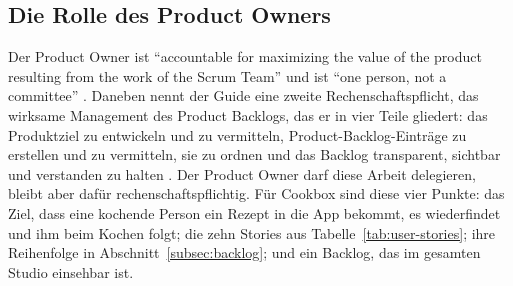 \subsection{Die Rolle des Product Owners}

%
%
%
Der Product Owner ist \enquote{accountable for maximizing the value of the
product resulting from the work of the Scrum Team} \parencite[p.~5]{scrumguide2020}
und ist \enquote{one person, not a committee} \parencite[p.~6]{scrumguide2020}.
Daneben nennt der Guide eine zweite Rechenschaftspflicht, das wirksame Management
des Product Backlogs, das er in vier Teile gliedert: das Produktziel zu
entwickeln und zu vermitteln, Product-Backlog-Einträge zu erstellen und zu
vermitteln, sie zu ordnen und das Backlog transparent, sichtbar und verstanden zu
halten \parencite[p.~6]{scrumguide2020}. Der Product Owner darf diese Arbeit
delegieren, bleibt aber dafür rechenschaftspflichtig. Für Cookbox sind diese vier Punkte: das Ziel, dass
eine kochende Person ein Rezept in die App bekommt, es wiederfindet und ihm beim
Kochen folgt; die zehn Stories aus Tabelle~\ref{tab:user-stories}; ihre
Reihenfolge in Abschnitt~\ref{subsec:backlog}; und ein Backlog, das im gesamten
Studio einsehbar ist.

